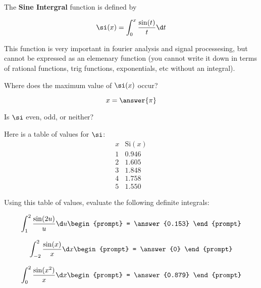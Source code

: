\documentclass{ximera}
\author{Steven Gubkin}
\begin{document}
\begin{exercise}


The \textbf{Sine Intergral} function is defined by

\[
\si(x) = \int_0^x \frac{\sin(t)}{t} \d t
\]

This function is very important in fourier analysis and signal
processesing, but cannot be expressed as an elemenary function (you
cannot write it down in terms of rational functions, trig functions,
exponentials, etc without an integral).


\begin{exercise}
	Where does the maximum value of $\si(x)$ occur? 
\begin{prompt} 
	\[x = \answer{\pi}\]
\end{prompt}
\end{exercise}

\begin{exercise}
	Is $\si$ even, odd, or neither?
\begin{prompt}
	\begin{multipleChoice}
	\end{multipleChoice}
\end{prompt}
\end{exercise}

Here is a table of values for $\si$:
\[
\begin{array}{c|c}
 x & \mathrm{Si}(x)\\ \hline
1 &  0.946\\
2 & 1.605\\
3 & 1.848\\
4 & 1.758\\
5 & 1.550
\end{array}
\]


Using this table of values, evaluate the following definite integrals:

\begin{exercise}
	\[
	\int_1^2 \frac{\sin(2u)}{u} \d u \begin{prompt} = \answer{0.153} \end{prompt} 
	\]
\end{exercise}

\begin{exercise}
	\[
	\int_{-2}^2 \frac{\sin(x)}{x} \d x \begin{prompt} = \answer{0} \end{prompt}
	\]
\end{exercise}

\begin{exercise}
	\[
	\int_0^2 \frac{\sin(x^2)}{x} \d x \begin{prompt} = \answer{0.879} \end{prompt}  
	\]
\end{exercise}

\end{exercise}
\end{document}
